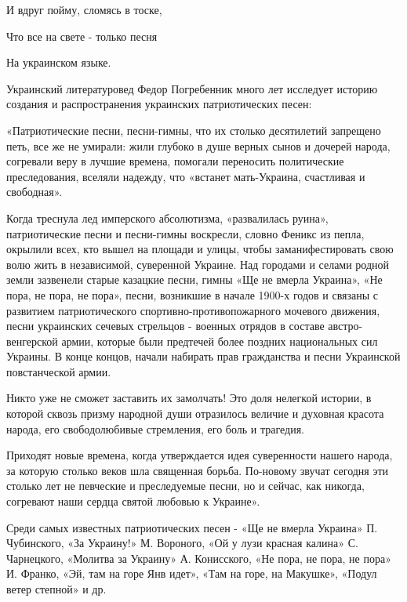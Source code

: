 И вдруг пойму, сломясь в тоске,



Что все на свете - только песня



На украинском языке.



Украинский литературовед Федор Погребенник много лет исследует историю создания и распространения украинских патриотических песен:



«Патриотические песни, песни-гимны, что их столько десятилетий запрещено петь, все же не умирали: жили глубоко в душе верных сынов и дочерей народа, согревали веру в лучшие времена, помогали переносить политические преследования, вселяли надежду, что «встанет мать-Украина, счастливая и свободная».



Когда треснула лед имперского абсолютизма, «развалилась руина», патриотические песни и песни-гимны воскресли, словно Феникс из пепла, окрылили всех, кто вышел на площади и улицы, чтобы заманифестировать свою волю жить в независимой, суверенной Украине. Над городами и селами родной земли зазвенели старые казацкие песни, гимны «Ще не вмерла Украина», «Не пора, не пора, не пора», песни, возникшие в начале 1900-х годов и связаны с развитием патриотического спортивно-противопожарного мочевого движения, песни украинских сечевых стрельцов - военных отрядов в составе австро-венгерской армии, которые были предтечей более поздних национальных сил Украины. В конце концов, начали набирать прав гражданства и песни Украинской повстанческой армии.



Никто уже не сможет заставить их замолчать! Это доля нелегкой истории, в которой сквозь призму народной души отразилось величие и духовная красота народа, его свободолюбивые стремления, его боль и трагедия.



Приходят новые времена, когда утверждается идея суверенности нашего народа, за которую столько веков шла священная борьба. По-новому звучат сегодня эти столько лет не певческие и преследуемые песни, но и сейчас, как никогда, согревают наши сердца святой любовью к Украине».



Среди самых известных патриотических песен - «Ще не вмерла Украина» П. Чубинского, «За Украину!» М. Вороного, «Ой у лузи красная калина» С. Чарнецкого, «Молитва за Украину» А. Конисского, «Не пора, не пора, не пора» И. Франко, «Эй, там на горе Янв идет», «Там на горе, на Макушке», «Подул ветер степной» и др.



